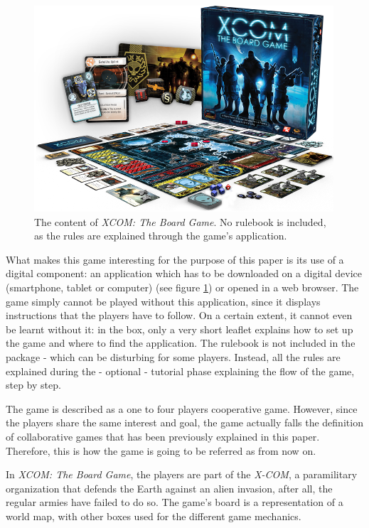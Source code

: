\begin{figure}[!ht]
    \centering
    \includegraphics[scale=0.5]{Images/xc01_layout.png}
    \caption{The content of \textit{XCOM: The Board Game}. No rulebook is included, as the rules are explained through the game's application\cite{pic:xcomlayout}.}
    \label{fig:XCOMBG}
\end{figure}

What makes this game interesting for the purpose of this paper is its use of a digital component: an application which has to be downloaded on a digital device (smartphone, tablet or computer) (see figure \ref{fig:XCOMBG}) or opened in a web browser. The game simply cannot be played without this application, since it displays instructions that the players have to follow. On a certain extent, it cannot even be learnt without it: in the box, only a very short leaflet explains how to set up the game and where to find the application. The rulebook is not included in the package - which can be disturbing for some players. Instead, all the rules are explained during the - optional - tutorial phase explaining the flow of the game, step by step. 

The game is described as a one to four players cooperative game. However, since the players share the same interest and goal, the game actually falls the definition of collaborative games that has been previously explained in this paper. Therefore, this is how the game is going to be referred as from now on.

In \textit{XCOM: The Board Game}, the players are part of the \textit{X-COM}, a paramilitary organization that defends the Earth against an alien invasion, after all, the regular armies have failed to do so. The game's board is a representation of a world map, with other boxes used for the different game mechanics.

